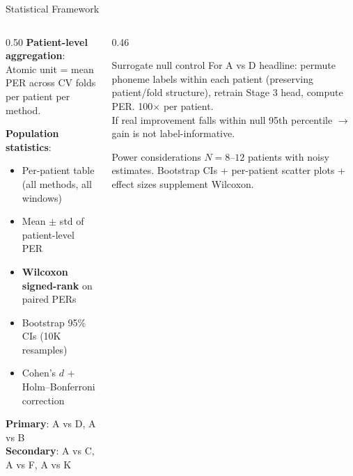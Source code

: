 \documentclass[aspectratio=169, 11pt]{beamer}
\begin{document}

\begin{frame}{Statistical Framework}

\begin{columns}[T]
\begin{column}{0.50\textwidth}
\small
\textbf{Patient-level aggregation}:\\
Atomic unit = mean PER across CV folds per patient per method.

\vspace{0.3em}
\textbf{Population statistics}:
\begin{itemize}\setlength{\itemsep}{0pt}
  \item Per-patient table (all methods, all windows)
  \item Mean $\pm$ std of patient-level PER
  \item \textbf{Wilcoxon signed-rank} on paired PERs
  \item Bootstrap 95\% CIs (10K resamples)
  \item Cohen's $d$ + Holm--Bonferroni correction
\end{itemize}

\vspace{0.2em}
\textbf{Primary}: A vs D, A vs B\\
\textbf{Secondary}: A vs C, A vs F, A vs K
\end{column}

\begin{column}{0.46\textwidth}
\begin{block}{\small Surrogate null control}
\small
For A vs D headline: permute phoneme labels within each patient (preserving patient/fold structure), retrain Stage 3 head, compute PER. 100$\times$ per patient.\\[4pt]
If real improvement falls within null 95th percentile $\to$ gain is not label-informative.
\end{block}

\vspace{0.4em}
\begin{exampleblock}{\small Power considerations}
\small
$N = 8$--$12$ patients with noisy estimates. Bootstrap CIs + per-patient scatter plots + effect sizes supplement Wilcoxon.
\end{exampleblock}
\end{column}
\end{columns}
\end{frame}
\end{document}
